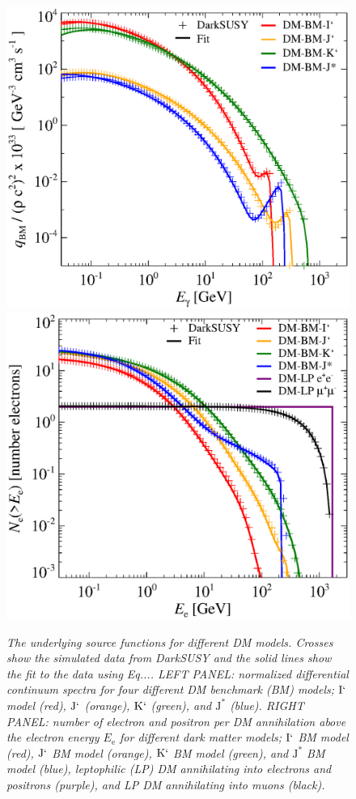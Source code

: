 \documentclass[10pt,aps,pra,reprint,amsmath,amsfonts,amssymb,showpacs]{revtex4-1}
\newcommand{\rmn}{\mathrm}
\newcommand{\e}{\rmn{e}}
\newcommand{\Km}{\rmn{K}`}
\newcommand{\Imm}{\rmn{I}`}
\newcommand{\Jm}{\rmn{J}^*}
\newcommand{\Jmm}{\rmn{J}`}
\begin{document}
\begin{figure}
\begin{minipage}{2.0\columnwidth}
 \includegraphics[width=0.49\columnwidth]{figures/fit.ds.flux.eps}
 \includegraphics[width=0.49\columnwidth]{figures/fit.epflux.int.eps}
\caption{\it The underlying source functions for different DM
  models. Crosses show the simulated data from DarkSUSY and the solid
  lines show the fit to the data using Eq.... LEFT PANEL: normalized
  differential continuum spectra for four different DM benchmark (BM)
  models; $\Imm$ model (red), $\Jmm$ (orange), $\Km$ (green), and
  $\Jm$ (blue). RIGHT PANEL: number of electron and positron per DM
  annihilation above the electron energy $E_\e$ for different dark
  matter models; $\Imm$ BM model (red), $\Jmm$ BM model (orange),
  $\Km$ BM model (green), and $\Jm$ BM model (blue), leptophilic (LP)
  DM annihilating into electrons and positrons (purple), and LP DM
  annihilating into muons (black).}
 \label{fig17}
\end{minipage}
\end{figure}
\end{document}
